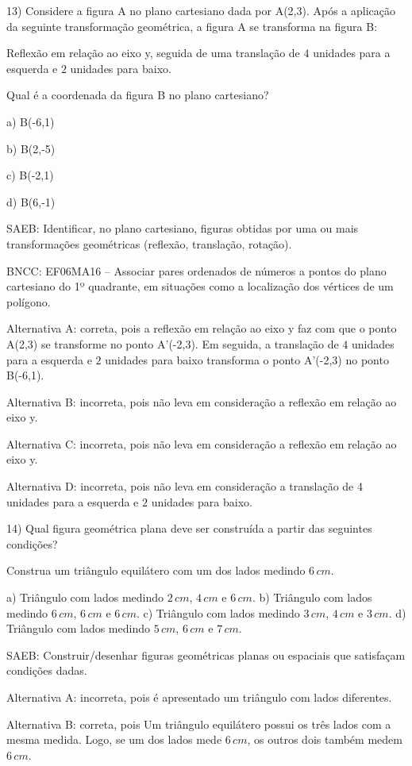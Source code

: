 13) Considere a figura A no plano cartesiano dada por A(2,3). Após a
aplicação da seguinte transformação geométrica, a figura A se transforma
na figura B:

Reflexão em relação ao eixo y, seguida de uma translação de $4$ unidades
para a esquerda e $2$ unidades para baixo.

Qual é a coordenada da figura B no plano cartesiano?

a) B(-6,1)

b) B(2,-5)

c) B(-2,1)

d) B(6,-1)

SAEB: Identificar, no plano cartesiano, figuras obtidas por uma ou mais
transformações geométricas (reflexão, translação, rotação).

BNCC: EF06MA16 -- Associar pares ordenados de números a pontos do plano
cartesiano do 1º quadrante, em situações como a localização dos vértices
de um polígono.

Alternativa A: correta, pois a reflexão em relação ao eixo y faz com que
o ponto A(2,3) se transforme no ponto A'(-2,3). Em seguida, a translação
de $4$ unidades para a esquerda e $2$ unidades para baixo transforma o ponto
A'(-2,3) no ponto B(-6,1).

Alternativa B: incorreta, pois não leva em consideração a reflexão em
relação ao eixo y.

Alternativa C: incorreta, pois não leva em consideração a reflexão em
relação ao eixo y.

Alternativa D: incorreta, pois não leva em consideração a translação de
4 unidades para a esquerda e $2$ unidades para baixo.

14) Qual figura geométrica plana deve ser construída a partir das
seguintes condições?

Construa um triângulo equilátero com um dos lados medindo $6\,cm$.

a) Triângulo com lados medindo $2\,cm$, $4\,cm$ e $6\,cm$. b) Triângulo com lados
medindo $6\,cm$, $6\,cm$ e $6\,cm$. c) Triângulo com lados medindo $3\,cm$, $4\,cm$ e $3\,cm$.
d) Triângulo com lados medindo $5\,cm$, $6\,cm$ e $7\,cm$.

SAEB: Construir/desenhar figuras geométricas planas ou espaciais que
satisfaçam condições dadas.

Alternativa A: incorreta, pois é apresentado um triângulo com lados
diferentes.

Alternativa B: correta, pois Um triângulo equilátero possui os três
lados com a mesma medida. Logo, se um dos lados mede $6\,cm$, os outros dois
também medem $6\,cm$.

